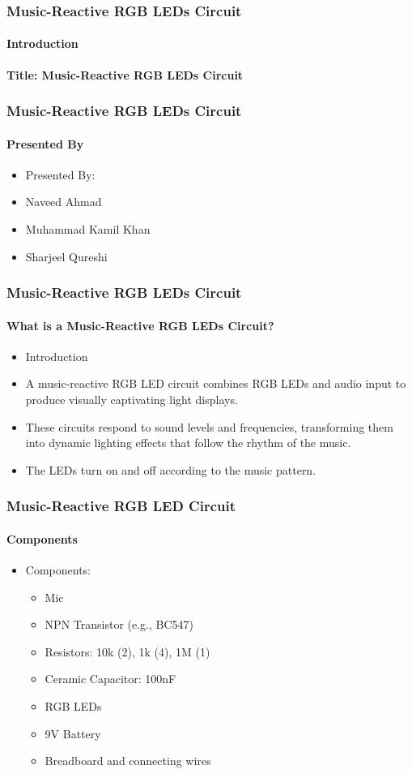 \documentclass{beamer}
\begin{document}
\begin{frame}
\frametitle{Music-Reactive RGB LEDs Circuit}
\framesubtitle{Introduction}
\begin{center}
\textbf{Title: Music-Reactive RGB LEDs Circuit}
\end{center}
\end{frame}

\begin{frame}
\frametitle{Music-Reactive RGB LEDs Circuit}
\framesubtitle{Presented By}
\begin{itemize}
  \item Presented By:
  \item Naveed Ahmad
  \item Muhammad Kamil Khan
  \item  Sharjeel Qureshi
\end{itemize}
\end{frame}

\begin{frame}
\frametitle{Music-Reactive RGB LEDs Circuit}
\framesubtitle{What is a Music-Reactive RGB LEDs Circuit?}
\begin{itemize}
  \item Introduction
  \item A music-reactive RGB LED circuit combines RGB LEDs and audio input to produce visually captivating light displays.
  \item These circuits respond to sound levels and frequencies, transforming them into dynamic lighting effects that follow the rhythm of the music.
  \item The LEDs turn on and off according to the music pattern.
\end{itemize}
\end{frame}

\begin{frame}
\frametitle{Music-Reactive RGB LED Circuit}
\framesubtitle{Components}
\begin{itemize}
  \item Components:
  \begin{itemize}
    \item Mic
    \item NPN Transistor (e.g., BC547)
    \item Resistors: 10k (2), 1k (4), 1M (1)
    \item Ceramic Capacitor: 100nF
    \item RGB LEDs
    \item 9V Battery
    \item Breadboard and connecting wires
  \end{itemize}
\end{itemize}
\end{frame}
\end{document}

